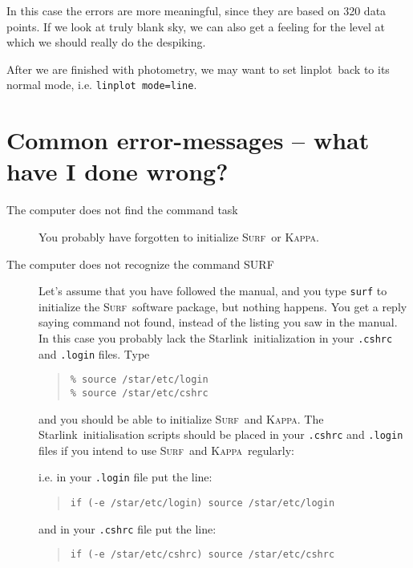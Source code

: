 \documentclass[twoside,11pt]{article}
\newenvironment{myquote}{\begin{quote}\begin{small}}{\end{small}\end{quote}}
\newcommand{\starlink}{\htmladdnormallink{Starlink}{http://star-www.rl.ac.uk/}}
\newcommand{\Kappa}{\xref{\textsc{Kappa}}{sun95}{}}
\newcommand{\surf}{\xref{\textsc{Surf}}{sun216}{}}
\newcommand{\task}[1]{\textsf{#1}}
\newcommand{\linplot}{\xref{\task{linplot}}{sun95}{LINPLOT}}
\newcommand{\htmladdnormallink}[2]{#1}
\newcommand{\xref}[3]{#1}
\newcommand{\xlabel}[1]{}
\begin{document}
{In this case the errors are more meaningful, since they are based on 
320 data points. If we look at truly blank sky, we can also get a 
feeling for the level at which we should really do the despiking.

After we are finished with photometry, we may want to set \linplot\
back to its normal mode, i.e. \texttt{\linplot\ mode=line}.


\section{\xlabel{common_error-messages_--_what_have_i_done_wrong}Common error-messages -- what have I done wrong?}

\begin{description}

\item[The computer does not find the command task]\mbox{}

You probably have forgotten to initialize \surf\ or \Kappa.

\item[The computer does not recognize the command SURF]\mbox{}

Let's assume that you have followed the manual, and you type \texttt{surf}
to initialize the \surf\ software package, but nothing happens.  You get
a reply saying command not found, instead of the listing you saw in the
manual. In this case you probably lack the \starlink\ initialization in
your \texttt{.cshrc} and \texttt{.login} files. Type

\begin{myquote} \begin{verbatim}
% source /star/etc/login
% source /star/etc/cshrc
\end{verbatim} \end{myquote}

and you should be able to initialize \surf\ and \Kappa. The \starlink\
initialisation scripts should be placed in your \texttt{.cshrc} and
\texttt{.login} files if you intend to use \surf\ and \Kappa\ regularly:

i.e. in your \texttt{.login} file put the line:
\begin{myquote}
\begin{verbatim}
if (-e /star/etc/login) source /star/etc/login
\end{verbatim}
\end{myquote}
and in  your \texttt{.cshrc} file put the line:
\begin{myquote}
\begin{verbatim}
if (-e /star/etc/cshrc) source /star/etc/cshrc
\end{verbatim}
\end{myquote}


\end{description}}
\end{document}
